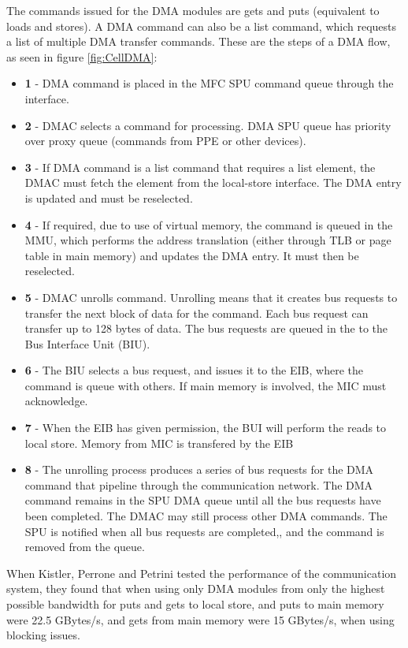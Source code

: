 The commands issued for the DMA modules are gets and puts (equivalent to loads and stores).
A DMA command can also be a list command, which requests a list of multiple DMA transfer commands.
These are the steps of a DMA flow, as seen in figure \ref{fig:CellDMA}:

\begin{itemize}
    \item \textbf{1} - DMA command is placed in the MFC SPU command queue through the interface.
    \item \textbf{2} - DMAC selects a command for processing. DMA SPU queue has priority over proxy queue (commands from PPE or other devices).
    \item \textbf{3} - If DMA command is a list command that requires a list element, the DMAC must fetch the element from the local-store interface. 
    The DMA entry is updated and must be reselected.
    \item \textbf{4} - If required, due to use of virtual memory, the command is queued in the MMU, which performs the address translation (either through TLB or page table in main memory) and updates the DMA entry. 
    It must then be reselected.
    \item \textbf{5} - DMAC unrolls command.
    Unrolling means that it creates bus requests to transfer the next block of data for the command.
    Each bus request can transfer up to 128 bytes of data.
    The bus requests are queued in the to the Bus Interface Unit (BIU).
    \item \textbf{6} - The BIU selects a bus request, and issues it to the EIB, where the command is queue with others.
    If main memory is involved, the MIC must acknowledge.
    \item \textbf{7} - When the EIB has given permission, the BUI will perform the reads to local store.
    Memory from MIC is transfered by the EIB
    \item \textbf{8} - The unrolling process produces a series of bus requests for the DMA command that pipeline through the communication network.
    The DMA command remains in the SPU DMA queue until all the bus requests have been completed.
    The DMAC may still process other DMA commands.
    The SPU is notified when all bus requests are completed,, and the command is removed from the queue. 
\end{itemize}


When Kistler, Perrone and Petrini tested the performance of the communication system, they found that when using only DMA  modules from only the highest possible bandwidth for puts and gets to local store, and puts to main memory were 22.5 GBytes/s, and gets from main memory were 15 GBytes/s, when using blocking issues.
